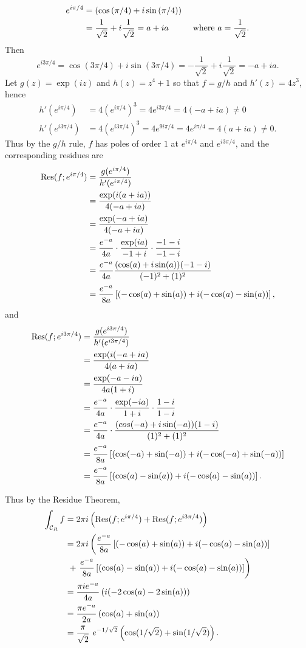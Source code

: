 \begin{align*}
e^{i\pi/4} & = \left( \cos \left( \pi/4 \right) + i \sin \left( \pi/4 \right) \right) && \\
& = \frac{1}{\sqrt{2}} + i \frac{1}{\sqrt{2}} =a+ia && \text{ where } a = \frac{1}{\sqrt{2}}.
\end{align*}
Then
\[
e^{i3\pi/4} = \cos (3\pi/4)+i \sin (3\pi/4) = -\frac{1}{\sqrt{2}}+i \frac{1}{\sqrt{2}} = -a +ia.
\]
Let $g(z) = \exp (iz)$ and $h(z) = z^4+1$ so that $f=g/h$ and $h'(z) = 4z^3$, hence
\begin{align*}
h'(e^{i\pi/4}) &= 4 (e^{i\pi/4})^3 = 4e^{i3\pi/4} = 4(-a+ia) \neq 0 \\
h'(e^{i3\pi/4}) & = 4 (e^{i3\pi/4})^3 = 4e^{9i\pi/4} = 4e^{i\pi/4} = 4 (a+ia) \neq 0.
\end{align*}
Thus by the $g/h$ rule, $f$ has poles of order $1$ at $e^{i\pi/4}$ and $e^{i3\pi/4}$, and the corresponding residues are
\begin{align*}
\mathrm{Res} (f;e^{i\pi/4}) & = \frac{g(e^{i\pi/4})}{h'(e^{i\pi/4})} \\
& = \frac{\exp (i(a+ia))}{4(-a+ia)} \\
& = \frac{\exp(-a+ia)}{4(-a+ia)} \\
& = \frac{e^{-a}}{4a} \cdot \frac{\exp(ia)}{-1+i} \cdot \frac{-1-i}{-1-i} \\
& = \frac{e^{-a}}{4a} \frac{(\cos(a)+i\sin(a))(-1-i)}{(-1)^2+(1)^2} \\
& = \frac{e^{-a}}{8a} \left[ (-\cos(a)+\sin(a))+ i (-\cos(a)-\sin(a)) \right], 
\end{align*}
and
\begin{align*}
\mathrm{Res} (f;e^{i3\pi/4}) & = \frac{g(e^{i3\pi/4})}{h'(e^{i3\pi/4})} \\
& = \frac{\exp(i(-a+ia)}{4(a+ia)} \\
& = \frac{\exp(-a-ia)}{4a(1+i)} \\
& = \frac{e^{-a}}{4a} \cdot \frac{\exp(-ia)}{1+i} \cdot \frac{1-i}{1-i} \\
& = \frac{e^{-a}}{4a} \cdot \frac{(cos(-a)+i \sin(-a))(1-i)}{(1)^2+(1)^2} \\
& = \frac{e^{-a}}{8a} \left[ (\cos(-a) + \sin (-a))+i(-\cos(-a) + \sin(-a) ) \right] \\
& = \frac{e^{-a}}{8a} \left[ ( \cos(a)-\sin(a) ) + i (-\cos(a)-\sin(a)) \right].
\end{align*}

Thus by the Residue Theorem,
\begin{align*}
\int_{\mathcal{C}_R} f & = 2\pi i \left( \mathrm{Res} (f;e^{i\pi/4}) +\mathrm{Res} (f;e^{i3\pi/4}) \right) \\
& = 2 \pi i \left( \frac{e^{-a}}{8a} \left[ (-\cos(a)+\sin(a))+ i (-\cos(a)-\sin(a)) \right] \right. \\ &\ + \left. \frac{e^{-a}}{8a} \left[ ( \cos(a)-\sin(a) ) + i (-\cos(a)-\sin(a)) \right] \right) \\
& = \frac{\pi ie^{-a}}{4a} \left( i (-2\cos(a)-2\sin(a)) \right) \\
& = \frac{\pi  e^{-a}}{2a} \left( \cos(a) + \sin (a) \right) \\
& = \frac{\pi}{\sqrt{2}}\ e^{-1/\sqrt{2}} \left( \cos (1/\sqrt{2}) + \sin (1/\sqrt{2}) \right).
\end{align*}




